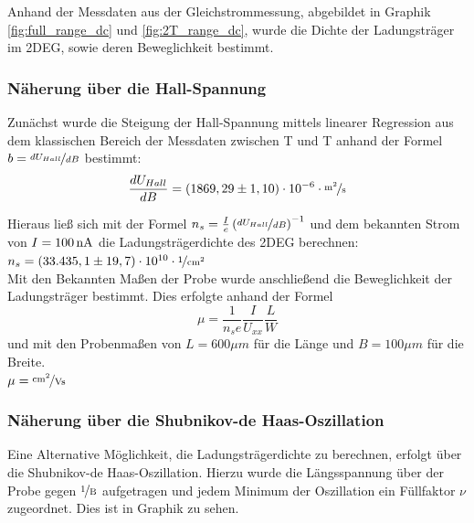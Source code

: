 

Anhand der Messdaten aus der Gleichstrommessung, abgebildet in Graphik \ref{fig:full_range_dc} und \ref{fig:2T_range_dc}, wurde die Dichte der Ladungsträger im 2DEG, sowie deren Beweglichkeit bestimmt.

\subsubsection{Näherung über die Hall-Spannung}
\label{ch:naeherung_hall}

Zunächst wurde die Steigung der Hall-Spannung mittels linearer Regression aus dem klassischen Bereich der Messdaten zwischen \unit[-2]{T} und \unit[2]{T} anhand der Formel $ b=\nicefrac{d U_{Hall}}{d B} $  
bestimmt:
\begin{equation}
	\d{U_{Hall}}{B} = (1869,29 \pm 1,10)\cdot10^{-6} \cdot  \unitfrac{m^2}{s}
\end{equation}

Hieraus ließ sich mit der Formel $n_s=\frac{I}{e}\left({\nicefrac{d U_{Hall}}{d B}}\right)^{-1}$ und dem bekannten Strom von $I=\unit[100]{nA}$ die Ladungsträgerdichte des 2DEG berechnen: 
\\
$n_s= ( 33.435,1 \pm 19,7) \cdot 10^{10}\cdot \unitfrac{1}{cm^2}$    %
\\
Mit den Bekannten Maßen der Probe wurde anschließend die Beweglichkeit der Ladungsträger bestimmt. Dies erfolgte anhand der Formel \\
\begin{equation}
	\mu=\frac{1}{n_se}\frac{I}{U_{xx}}\frac{L}{W}
\end{equation}
und mit den Probenmaßen von $L=600\mu m$ für die Länge und $B=100\mu m$ für die Breite. \\

$\mu= \unitfrac{cm^2}{Vs}$  %

\subsubsection{Näherung über die Shubnikov-de Haas-Oszillation}
\label{ch:naeherung_sdho}

Eine Alternative Möglichkeit, die Ladungsträgerdichte zu berechnen, erfolgt über die Shubnikov-de Haas-Oszillation. Hierzu wurde die Längsspannung über der Probe 
 gegen $\unitfrac{1}{B}$ aufgetragen und jedem Minimum der Oszillation ein Füllfaktor $\nu$ zugeordnet. Dies ist in Graphik %
zu sehen. 

